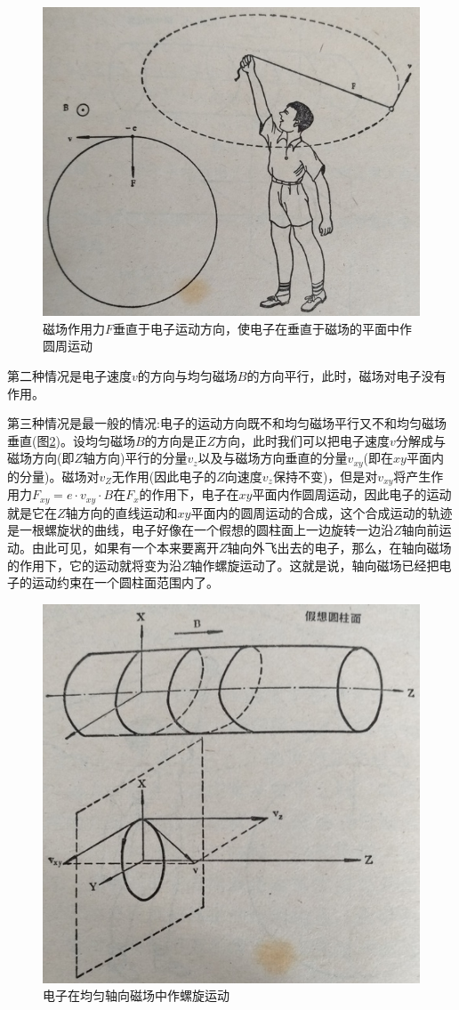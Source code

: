 \begin{figure}[phtb]
	\centering
	\includegraphics[width=0.75\linewidth]{figure/ch7-2}
	\caption{磁场作用力$ F $垂直于电子运动方向，使电子在垂直于磁场的平面中作圆周运动}
	\label{ch7-2}
\end{figure}

第二种情况是电子速度$ v $的方向与均匀磁场$ B $的方向平行，此时，磁场对电子没有作用。

第三种情况是最一般的情况:电子的运动方向既不和均匀磁场平行又不和均匀磁场垂直(图\ref{ch7-3})。设均匀磁场$ B $的方向是正$ Z $方向，此时我们可以把电子速度$ v $分解成与磁场方向(即$ Z $轴方向)平行的分量$ v_z $以及与磁场方向垂直的分量$ v_{xy} $(即在$ xy $平面内的分量)。磁场对$ v_Z $无作用(因此电子的$ Z $向速度$ v_z $保持不变)，但是对$ v_{xy} $将产生作用力$ F_{xy} = e\cdot v_{xy}\cdot B $在$ F_x $的作用下，电子在$ xy $平面内作圆周运动，因此电子的运动就是它在$ Z $轴方向的直线运动和$ xy $平面内的圆周运动的合成，这个合成运动的轨迹是一根螺旋状的曲线，电子好像在一个假想的圆柱面上一边旋转一边沿$ Z $轴向前运动。由此可见，如果有一个本来要离开$ Z $轴向外飞出去的电子，那么，在轴向磁场的作用下，它的运动就将变为沿$ Z $轴作螺旋运动了。这就是说，轴向磁场已经把电子的运动约束在一个圆柱面范围内了。

\begin{figure}[phtb]
	\centering
	\includegraphics[width=0.6\linewidth]{figure/ch7-3}
	\caption{电子在均匀轴向磁场中作螺旋运动}
	\label{ch7-3}
\end{figure}


